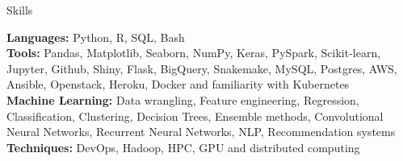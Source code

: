 \documentclass{resume} %
\begin{document}
  

\begin{rSection}{Skills} \itemsep -3pt  

{\textbf{Languages:} Python, R, SQL, Bash}  \\
{\textbf{Tools:} Pandas, Matplotlib, Seaborn, NumPy, Keras, PySpark, Scikit-learn, Jupyter, Github, Shiny, Flask, BigQuery, Snakemake, MySQL, Postgres, AWS, Ansible, Openstack, Heroku, Docker and familiarity with Kubernetes} \\
{\textbf{Machine Learning:} Data wrangling, Feature engineering, Regression, Classification, Clustering, Decision Trees, Ensemble methods, Convolutional Neural Networks, Recurrent Neural Networks, NLP, Recommendation systems} \\
{\textbf{Techniques:} DevOps, Hadoop, HPC, GPU and distributed computing}
\end{rSection}  
 
\vspace{-7pt}
\end{document}
